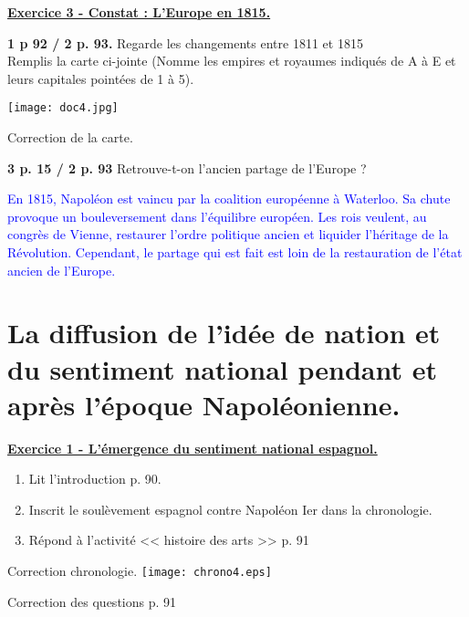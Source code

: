 \documentclass{beamer}
\begin{document}
 \begin{frame} \underline{\textbf{Exercice 3 - Constat : L'Europe en 1815.}}\\
 \begin{minipage}{5cm}
\textbf{1 p 92 / 2 p. 93.} Regarde les changements entre 1811 et 1815 \\
 Remplis la carte ci-jointe (Nomme les empires et royaumes indiqués de A à E et leurs capitales pointées de 1 à 5).\\
 \end{minipage}
 \begin{minipage}{5cm}
\texttt{[image: doc4.jpg]}
 \end{minipage}
 \end{frame}
 
 \begin{frame} Correction de la carte.
 \end{frame}
 
\begin{frame}
\textbf{3 p. 15 / 2 p. 93} Retrouve-t-on l'ancien partage de l'Europe ? \\ 
 \end{frame}
 
 \begin{frame}
 \textcolor{blue}{ %
  En 1815, Napoléon est vaincu par la coalition européenne à Waterloo. Sa chute provoque un bouleversement dans l'équilibre européen. Les rois veulent, au congrès de Vienne, restaurer l'ordre politique ancien et liquider l'héritage de la Révolution. Cependant, le partage qui est fait est loin de la restauration de l'état ancien de l'Europe.}
 \end{frame}

 
 \section{La diffusion de l'idée de nation et du sentiment national pendant et après l'époque Napoléonienne.}
 
 \begin{frame} \underline{\textbf{Exercice 1 - L'émergence du sentiment national espagnol.}}
 \begin{enumerate}
 \item Lit l'introduction p. 90.
 \item Inscrit le soulèvement espagnol contre Napoléon Ier dans la chronologie.
 \item Répond à l'activité << histoire des arts >> p. 91
 \end{enumerate}
 
 \end{frame}
 
 \begin{frame} Correction chronologie.
\texttt{[image: chrono4.eps]}
 \end{frame}
 
 \begin{frame}Correction des questions p. 91

 \end{frame}
  
\end{document}
